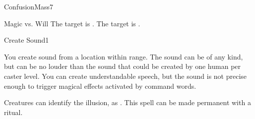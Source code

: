 \begin{spellsection}{Confusion}{Mass}{7}
\begin{spellheader}
\end{spellheader}
\begin{spellcontent}
    \begin{spelltargetinginfo}
    \end{spelltargetinginfo}
    \begin{spelleffects}
        \begin{spellattack}{Magic vs. Will}
            \spellsuccess The target is \disoriented.
            \spellcritical The target is \confused.
        \end{spellattack}
    \end{spelleffects}
\end{spellcontent}
\begin{spellfooter}
\end{spellfooter}
\end{spellsection}

\begin{spellsection}{Create Sound}{1}
\begin{spellheader}
\end{spellheader}
\begin{spellcontent}
    \begin{spelltargetinginfo}
        \spellrng{\rngmed}
    \end{spelltargetinginfo}
    \begin{spelleffects}
        \spelleffect You create sound from a location within range. The sound can be of any kind, but can be no louder than the sound that could be created by one human per caster level. You can create understandable speech, but the sound is not precise enough to trigger magical effects activated by command words.
        \spelldur \durshort \dismissable
    \end{spelleffects}
\end{spellcontent}
\begin{spellfooter}
    \spellnotes Creatures can identify the illusion, as . This spell can be made permanent with a  ritual.
\end{spellfooter}
\end{spellsection}

